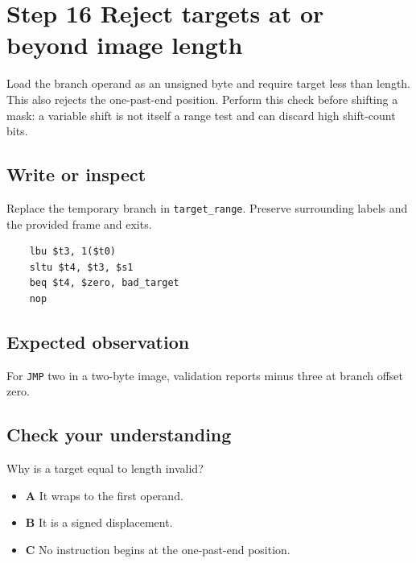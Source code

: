 \section{Step 16 Reject targets at or beyond image length}\label{vm-s16}

Load the branch operand as an unsigned byte and require target less than length. This also rejects the one-past-end position. Perform this check before shifting a mask: a variable shift is not itself a range test and can discard high shift-count bits.

\subsection{Write or inspect}
Replace the temporary branch in \texttt{target\_range}. Preserve surrounding labels and the provided frame and exits.

\begin{verbatim}
    lbu $t3, 1($t0)
    sltu $t4, $t3, $s1
    beq $t4, $zero, bad_target
    nop
\end{verbatim}
\subsection{Expected observation}
For \texttt{JMP} two in a two-byte image, validation reports minus three at branch offset zero.

\subsection{Check your understanding}
Why is a target equal to length invalid?

\begin{itemize}
  \item \textbf{A} It wraps to the first operand.
  \item \textbf{B} It is a signed displacement.
  \item \textbf{C} No instruction begins at the one-past-end position.
\end{itemize}
